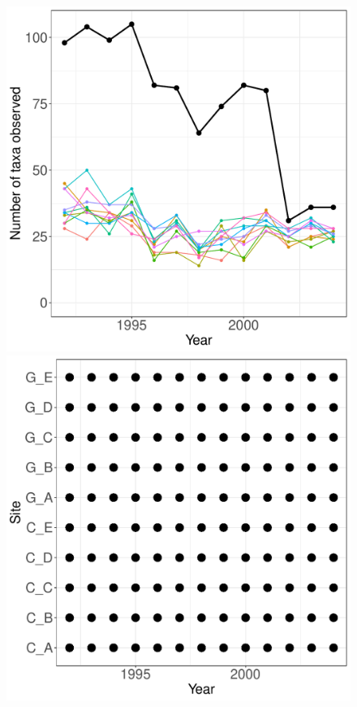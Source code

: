 \documentclass[11pt, oneside]{article}
\begin{document}
\begin{figure}[h!]
\includegraphics[scale = 0.4]{sev-arthropods-compagnoni_num_taxa_over_time.pdf}
\includegraphics[scale = 0.4]{sev-arthropods-compagnoni_spatiotemporal_sampling_effort.pdf}

\end{figure}
\end{document}
